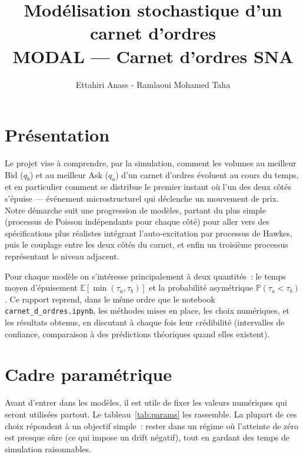 \documentclass[11pt,a4paper]{article}
\title{\vspace{-1.5cm}\textbf{Modélisation stochastique d'un carnet d'ordres}\\[0.3em]
       \large MODAL --- Carnet d'ordres SNA}
\author{Ettahiri Anass - Ramlaoui Mohamed Taha}
\date{}
\newcommand{\E}{\mathbb{E}}
\newcommand{\Pb}{\mathbb{P}}
\begin{document}
\maketitle
\vspace{-1cm}

\section*{Présentation}

Le projet vise à comprendre, par la simulation, comment les volumes au meilleur Bid
($q_b$) et au meilleur Ask ($q_a$) d'un carnet d'ordres évoluent au cours du
temps, et en particulier comment se distribue le premier instant où l'un des
deux côtés s'épuise --- événement microstructurel qui déclenche un mouvement
de prix. Notre démarche suit une progression de modèles, partant du plus simple
(processus de Poisson indépendants pour chaque côté) pour aller vers des
spécifications plus réalistes intégrant l'auto-excitation par processus de
Hawkes, puis le couplage entre les deux côtés du carnet, et enfin un troisième
processus représentant le niveau adjacent.

Pour chaque modèle on s'intéresse principalement à deux quantités~: le temps
moyen d'épuisement $\E[\min(\tau_a, \tau_b)]$ et la probabilité asymétrique
$\Pb(\tau_a < \tau_b)$. Ce rapport reprend, dans le même ordre que le notebook
\texttt{carnet\_d\_ordres.ipynb}, les méthodes mises en place, les choix
numériques, et les résultats obtenus, en discutant à chaque fois leur
crédibilité (intervalles de confiance, comparaison à des prédictions
théoriques quand elles existent).

\section{Cadre paramétrique}
\label{sec:params}

Avant d'entrer dans les modèles, il est utile de fixer les valeurs numériques
qui seront utilisées partout. Le tableau~\ref{tab:params} les rassemble. La
plupart de ces choix répondent à un objectif simple~: rester dans un régime où
l'atteinte de zéro est presque sûre (ce qui impose un drift négatif), tout en
gardant des temps de simulation raisonnables.
\end{document}
